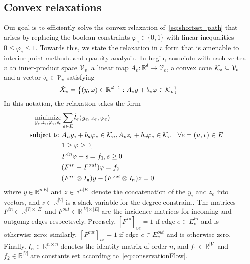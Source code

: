 \documentclass[letterpaper, 11pt]{article}
\begin{document}
\subsection{Convex relaxations}
Our goal is to efficiently solve the convex relaxation of~\eqref{eq:shortest_path}
that arises by replacing the boolean constraints $\varphi_e \in \{0, 1\}$ 
with linear inequalities $0 \le \varphi_e \le 1$. Towards this, we
state the relaxation in a form that is amenable to interior-point methods and sparsity 
analysis.   To begin, associate with each vertex $v$  an inner-product space $\mathcal{V}_v$,
a linear map $A_v : \mathbb{R}^{d} \rightarrow \mathcal{V}_e$, a
convex cone $\mathcal{K}_v \subseteq \mathcal{V}_v$ and a vector $b_v \in \mathcal{V}_v$ satisfying
\[
  \tilde X_v = \left\{ (y, \varphi) \in \mathbb{R}^{d+1} : A_v y  + b_v \varphi \in \mathcal{K}_v  \right\} \qquad
\]
In this notation, the relaxation takes the form
\begin{align}~\label{cp:coneRelax}
  \begin{aligned}
    \operatorname*{minimize}_{y_e, z_e, \varphi_e, s_e} & \sum_{e \in E}\tilde l_e(y_e, z_e, \varphi_e)\\
    \mbox{subject to } &A_u y_e + b_u \varphi_e \in \mathcal{K}_u ,  A_v z_e + b_v \varphi_e \in \mathcal{K}_v  & \forall e = (u, v) \in E \\
                      & 1 \ge \varphi \ge 0,  \\
                      & F^{in} \varphi  + s   = f_1, s \ge 0\\
                      & (F^{in} - F^{out}) \varphi  = f_2\\
                      & (F^{in} \otimes I_n)  y - (F^{out} \otimes I_n) z  = 0\\
  \end{aligned}
\end{align}
where $y \in \mathbb{R}^{ n |E|} $ and $z \in \mathbb{R}^{ n |E|}$ denote the concatenation of the $y_e$ and $z_e$
into vectors, and $s \in \mathbb{R}^{|V|}$ is a slack variable for the degree constraint. 
The matrices $F^{in} \in \mathbb{R}^{|V| \times |E|}$ 
and $F^{out} \in \mathbb{R}^{|V| \times |E|}$ are the incidence matrices for incoming and outgoing edges respectively.
Precisely, $[F^{in}]_{ve} = 1$ if edge $e \in E^{in}_{v}$ and is otherwise zero;
similarly, $[F^{out}]_{ve} = 1$ if edge $e \in E^{out}_{v}$ and is otherwise zero.
Finally, $I_n \in \mathbb{R}^{n \times n}$ denotes the identity matrix of order $n$,
and $f_1 \in \mathbb{R}^{|V|}$ and $f_2\in \mathbb{R}^{|V|}$ are constants set according to~\eqref{eq:conservationFlow}.
\end{document}
